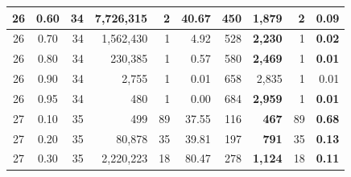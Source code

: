 \begin{table}[H]
\begin{tabular}{|c|c|r|r|r|r|r|r|r|r|}
        26                              & 0.60                               & 34                                              & 7,726,315                                        & 2             & 40.67         & 450           & \textbf{1,879}   & 2             & \textbf{0.09} \\ \hline
        26                              & 0.70                               & 34                                              & 1,562,430                                        & 1             & 4.92          & 528           & \textbf{2,230}   & 1             & \textbf{0.02} \\ \hline
        26                              & 0.80                               & 34                                              & 230,385                                          & 1             & 0.57          & 580           & \textbf{2,469}   & 1             & \textbf{0.01} \\ \hline
        26                              & 0.90                               & 34                                              & 2,755                                            & 1             & 0.01          & 658           & 2,835            & 1             & 0.01          \\ \hline
        26                              & 0.95                               & 34                                              & 480                                              & 1             & 0.00          & 684           & \textbf{2,959}   & 1             & \textbf{0.01} \\ \hline
        27                              & 0.10                               & 35                                              & 499                                              & 89            & 37.55         & 116           & \textbf{ 467}    & 89            & \textbf{0.68} \\ \hline
        27                              & 0.20                               & 35                                              & 80,878                                           & 35            & 39.81         & 197           & \textbf{ 791}    & 35            & \textbf{0.13} \\ \hline
        27                              & 0.30                               & 35                                              & 2,220,223                                        & 18            & 80.47         & 278           & \textbf{1,124}   & 18            & \textbf{0.11} \\ \hline

\end{tabular}
\end{table}
